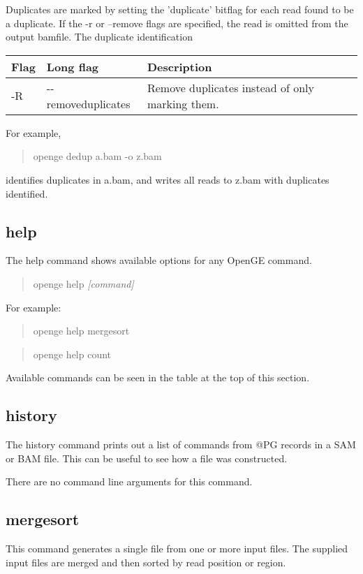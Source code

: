 \documentclass[11pt]{article}
\newcommand {\cmd}[1] {\begin{quote}#1\end{quote}}
\begin{document}
Duplicates are marked by setting the 'duplicate' bitflag for each read found to be a duplicate. If the -r or --remove flags are specified, the read is omitted from the output bamfile. The duplicate identification 

\begin{center}
\begin{tabular}{llp{3.5in}}
\hline
Flag&Long flag&Description\\ \hline
-R&{-}{-}removeduplicates&Remove duplicates instead of only marking them.\\
\end{tabular}
\end{center}

For example,
\cmd{openge dedup a.bam -o z.bam} 
identifies duplicates in a.bam, and writes all reads to z.bam with duplicates identified.

\subsection {help}
The help command shows available options for any OpenGE command. 

\cmd{openge help \textit{[command]}}

For example:

\cmd{openge help mergesort}

\cmd{openge help count}

Available commands can be seen in the table at the top of this section.

\subsection {history}
The history command prints out a list of commands from @PG records in a SAM or BAM file. This can be useful to see how a file was constructed.

There are no command line arguments for this command.

\subsection {mergesort}
This command generates a single file from one or more input files. The supplied input files are merged and then sorted by read position or region.
\end{document}

